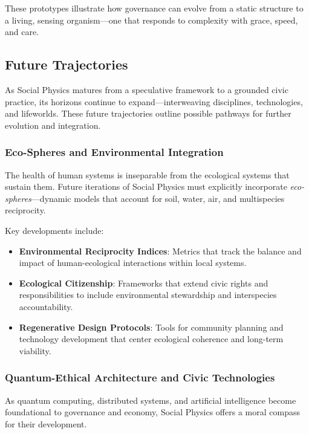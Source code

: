 \documentclass{article}
\theoremstyle{plain}
\theoremstyle{claimstyle}
\begin{document}
These prototypes illustrate how governance can evolve from a static structure to a living, sensing organism—one that responds to complexity with grace, speed, and care.

\subsection{Future Trajectories}

As Social Physics matures from a speculative framework to a grounded civic practice, its horizons continue to expand—interweaving disciplines, technologies, and lifeworlds. These future trajectories outline possible pathways for further evolution and integration.

\subsubsection{Eco-Spheres and Environmental Integration}

The health of human systems is inseparable from the ecological systems that sustain them. Future iterations of Social Physics must explicitly incorporate \textit{eco-spheres}—dynamic models that account for soil, water, air, and multispecies reciprocity.

Key developments include:

\begin{itemize}
    \item \textbf{Environmental Reciprocity Indices}: Metrics that track the balance and impact of human-ecological interactions within local systems.
    \item \textbf{Ecological Citizenship}: Frameworks that extend civic rights and responsibilities to include environmental stewardship and interspecies accountability.
    \item \textbf{Regenerative Design Protocols}: Tools for community planning and technology development that center ecological coherence and long-term viability.
\end{itemize}

\subsubsection{Quantum-Ethical Architecture and Civic Technologies}

As quantum computing, distributed systems, and artificial intelligence become foundational to governance and economy, Social Physics offers a moral compass for their development.
\end{document}
